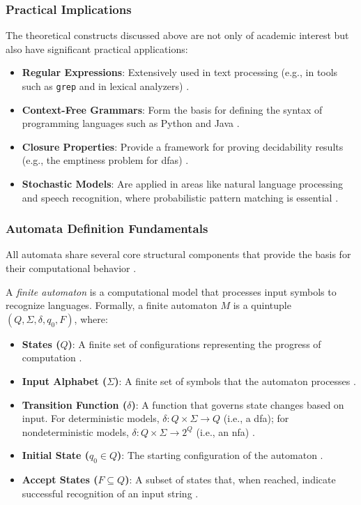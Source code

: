 \subsubsection{Practical Implications}
The theoretical constructs discussed above are not only of academic interest but also have significant practical applications:
\begin{itemize}
    \item \textbf{Regular Expressions}: Extensively used in text processing (e.g., in tools such as \texttt{grep} and in lexical analyzers) \cite{kernighan1984unix, hopcroft2006introduction}.
    \item \textbf{Context-Free Grammars}: Form the basis for defining the syntax of programming languages such as Python and Java \cite{chomsky1956three, hopcroft2006introduction}.
    \item \textbf{Closure Properties}: Provide a framework for proving decidability results (e.g., the emptiness problem for \glspl{dfa}) \cite{hopcroft2006introduction}.
    \item \textbf{Stochastic Models}: Are applied in areas like natural language processing and speech recognition, where probabilistic pattern matching is essential \cite{rabin1963probabilistic}.
\end{itemize}

\subsubsection{Automata Definition Fundamentals}
All automata share several core structural components that provide the basis for their computational behavior \cite{hopcroft2006introduction, chomsky1956three}.

\begin{definition}
\label{def:finite-automaton}
A \textit{finite automaton} is a computational model that processes input symbols to recognize languages. Formally, a finite automaton $M$ is a quintuple $(Q, \Sigma, \delta, q_0, F)$, where:
\begin{itemize}
    \item \textbf{States ($Q$)}: A finite set of configurations representing the progress of computation \cite{hopcroft2006introduction}.
    \item \textbf{Input Alphabet ($\Sigma$)}: A finite set of symbols that the automaton processes \cite{hopcroft2006introduction}.
    \item \textbf{Transition Function ($\delta$)}: A function that governs state changes based on input. For deterministic models, $\delta: Q \times \Sigma \to Q$ (i.e., a \gls{dfa}); for nondeterministic models, $\delta: Q \times \Sigma \to 2^Q$ (i.e., an \gls{nfa}) \cite{chomsky1956three, hopcroft2006introduction}.
    \item \textbf{Initial State ($q_0 \in Q$)}: The starting configuration of the automaton \cite{hopcroft2006introduction}.
    \item \textbf{Accept States ($F \subseteq Q$)}: A subset of states that, when reached, indicate successful recognition of an input string \cite{hopcroft2006introduction}.
\end{itemize}
\end{definition}

